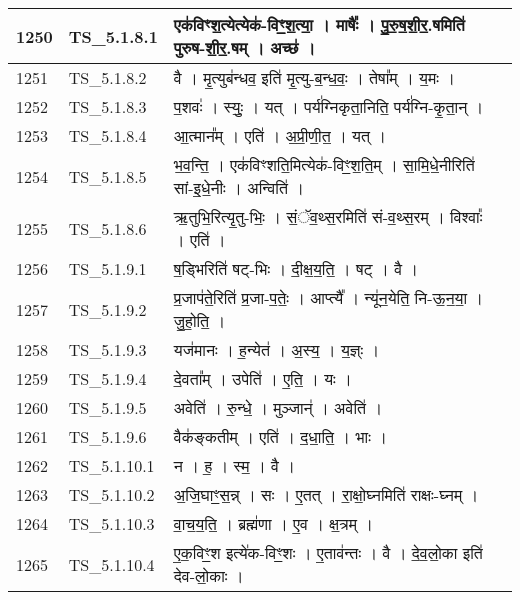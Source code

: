 \documentclass[17pt]{extarticle}
\begin{document}
\begin{longtable}{||p{0.4in}||p{0.9in}||p{4.0in}||p{0.9in}||}
        \hline
            1250 & TS\_5.1.8.1 & एक॑विꣳश॒त्येत्येक॑{-}विꣳ॒॒श॒त्या॒   ।   माषैः᳚   ।   पु॒रु॒ष॒शी॒र॒.षमिति॑ पुरुष{-}शी॒र॒.षम्   ।   अच्छ॑   ।    &      \\
        \hline
            1251 & TS\_5.1.8.2 & वै   ।   मृ॒त्युब॑न्धव॒ इति॑ मृ॒त्यु{-}ब॒न्ध॒वः॒   ।   तेषा᳚म्   ।   य॒मः   ।    &      \\
        \hline
            1252 & TS\_5.1.8.3 & प॒शवः॑   ।   स्युः॒   ।   यत्   ।   पर्य॑ग्निकृता॒निति॒ पर्य॑ग्नि{-}कृ॒ता॒न्   ।    &      \\
        \hline
            1253 & TS\_5.1.8.4 & आ॒त्मान᳚म्   ।   एति॑   ।   अ॒प्री॒णी॒त॒   ।   यत्   ।    &      \\
        \hline
            1254 & TS\_5.1.8.5 & भ॒व॒न्ति॒   ।   एक॑विꣳशति॒मित्येक॑{-}विꣳ॒॒श॒ति॒म्   ।   सा॒मि॒धे॒नीरिति॑ सां{-}इ॒धे॒नीः   ।   अन्विति॑   ।    &      \\
        \hline
            1255 & TS\_5.1.8.6 & ऋ॒तुभि॒रित्यृ॒तु{-}भिः॒   ।   सं॒ॅव॒थ्स॒रमिति॑ सं{-}व॒थ्स॒रम्   ।   विश्वाः᳚   ।   एति॑   ।    &      \\
        \hline
            1256 & TS\_5.1.9.1 & ष॒ड्भिरिति॑ षट्{-}भिः   ।   दी॒क्ष॒य॒ति॒   ।   षट्   ।   वै   ।    &      \\
        \hline
            1257 & TS\_5.1.9.2 & प्र॒जाप॑ते॒रिति॑ प्र॒जा{-}प॒तेः॒   ।   आप्त्यै᳚   ।   न्यू॑न॒येति॒ नि{-}ऊ॒न॒या॒   ।   जु॒हो॒ति॒   ।    &      \\
        \hline
            1258 & TS\_5.1.9.3 & यज॑मानः   ।   ह॒न्येत॑   ।   अ॒स्य॒   ।   य॒ज्ञ्ः   ।    &      \\
        \hline
            1259 & TS\_5.1.9.4 & दे॒वता᳚म्   ।   उपेति॑   ।   ए॒ति॒   ।   यः   ।    &      \\
        \hline
            1260 & TS\_5.1.9.5 & अवेति॑   ।   रु॒न्धे॒   ।   मुञ्जान्॑   ।   अवेति॑   ।    &      \\
        \hline
            1261 & TS\_5.1.9.6 & वैक॑ङ्कतीम्   ।   एति॑   ।   द॒धा॒ति॒   ।   भाः   ।    &      \\
        \hline
            1262 & TS\_5.1.10.1 & न   ।   ह॒   ।   स्म॒   ।   वै   ।    &      \\
        \hline
            1263 & TS\_5.1.10.2 & अ॒जि॒घाꣳ॒॒स॒न्न्   ।   सः   ।   ए॒तत्   ।   रा॒क्षो॒घ्नमिति॑ राक्षः{-}घ्नम्   ।    &      \\
        \hline
            1264 & TS\_5.1.10.3 & वा॒च॒य॒ति॒   ।   ब्रह्म॑णा   ।   ए॒व   ।   क्ष॒त्रम्   ।    &      \\
        \hline
            1265 & TS\_5.1.10.4 & ए॒क॒विꣳ॒॒श इत्ये॑क{-}विꣳ॒॒शः   ।   ए॒ताव॑न्तः   ।   वै   ।   दे॒व॒लो॒का इति॑ देव{-}लो॒काः   ।    &      \\

\end{longtable}
\end{document}
